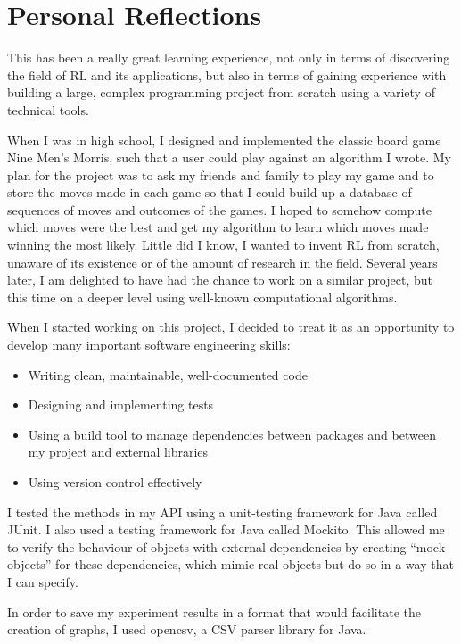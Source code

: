 \documentclass[11pt,a4paper,twoside,openright]{report}
\begin{document}
\section{Personal Reflections}

This has been a really great learning experience, not only in terms of discovering the field of RL and its applications, but also in terms of gaining experience with building a large, complex programming project from scratch using a variety of technical tools.

When I was in high school, I designed and implemented the classic board game Nine Men’s Morris, such that a user could play against an algorithm I wrote. My plan for the project was to ask my friends and family to play my game and to store the moves made in each game so that I could build up a database of sequences of moves and outcomes of the games. I hoped to somehow compute which moves were the best and get my algorithm to learn which moves made winning the most likely. Little did I know, I wanted to invent RL from scratch, unaware of its existence or of the amount of research in the field. Several years later, I am delighted to have had the chance to work on a similar project, but this time on a deeper level using well-known computational algorithms.

When I started working on this project, I decided to treat it as an opportunity to develop many important software engineering skills:

\begin{itemize}
	\item Writing clean, maintainable, well-documented code
	\item Designing and implementing tests
	\item Using a build tool to manage dependencies between packages and between my project and external libraries
	\item Using version control effectively
\end{itemize}

I tested the methods in my API using a unit-testing framework for Java called JUnit. I also used a testing framework for Java called Mockito. This allowed me to verify the behaviour of objects with external dependencies by creating “mock objects” for these dependencies, which mimic real objects but do so in a way that I can specify.

In order to save my experiment results in a format that would facilitate the creation of graphs, I used opencsv, a CSV parser library for Java.
\end{document}
